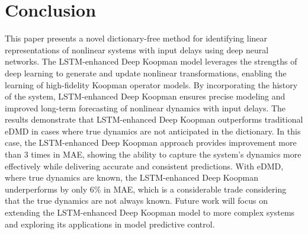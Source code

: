 \documentclass[conference]{IEEEtran}
\begin{document}
\section{Conclusion}
This paper presents a novel dictionary-free method for identifying linear representations of nonlinear systems with input delays using deep neural networks. The LSTM-enhanced Deep Koopman model leverages the strengths of deep learning to generate and update nonlinear transformations, enabling the learning of high-fidelity Koopman operator models. By incorporating the history of the system, LSTM-enhanced Deep Koopman ensures precise modeling and improved long-term forecasting of nonlinear dynamics with input delays. The results demonstrate that LSTM-enhanced Deep Koopman outperforms traditional eDMD in cases where true dynamics are not anticipated in the dictionary. In this case, the LSTM-enhanced Deep Koopman approach provides improvement more than \(3\) times in MAE, showing the ability to capture the system's dynamics more effectively while delivering accurate and consistent predictions. With eDMD, where true dynamics are known, the LSTM-enhanced Deep Koopman underperforms by only \(6\%\) in MAE, which is a considerable trade considering that the true dynamics are not always known. Future work will focus on extending the LSTM-enhanced Deep Koopman model to more complex systems and exploring its applications in model predictive control.



\end{document}
